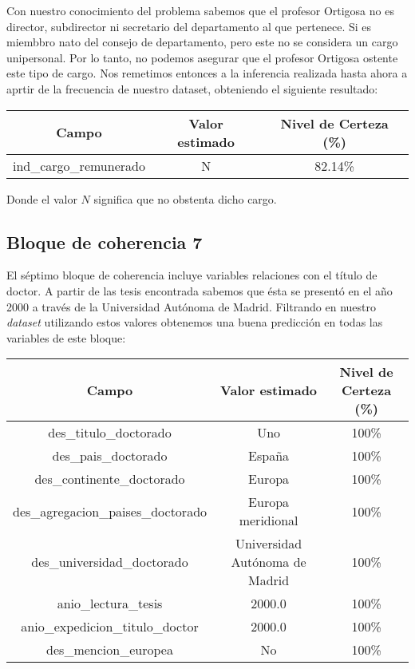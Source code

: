\documentclass[a4paper]{article}
\begin{document}
Con nuestro conocimiento del problema sabemos que el profesor Ortigosa no es director, subdirector ni secretario del departamento al que pertenece. Si es miembbro nato del consejo de departamento, pero este no se considera un cargo unipersonal. Por lo tanto, no podemos asegurar que el profesor Ortigosa ostente este tipo de cargo. Nos remetimos entonces a la inferencia realizada hasta ahora a aprtir de la frecuencia de nuestro dataset, obteniendo el siguiente resultado:

\begin{table}[H]
	\centering
	\begin{tabular}{ccc}
		\textbf{Campo}                         & \textbf{Valor estimado}                               & \textbf{Nivel de Certeza (\%)} \\ \hline
		ind\_cargo\_remunerado                 & N                                  & 82.14\%                     
	\end{tabular}
\end{table}

Donde el valor $N$ significa que no obstenta dicho cargo.

\subsection{Bloque de coherencia 7}

El séptimo bloque de coherencia incluye variables relaciones con el título de doctor. A partir de las tesis encontrada sabemos que ésta se presentó en el año 2000 a través de la Universidad Autónoma de Madrid. Filtrando en nuestro \emph{dataset} utilizando estos valores obtenemos una buena predicción en todas las variables de este bloque:

\begin{table}[H]
	\centering
	\begin{tabular}{ccc}
		\textbf{Campo}                     & \textbf{Valor estimado}        & \textbf{Nivel de Certeza (\%)} \\ \hline
		des\_titulo\_doctorado             & Uno                            & 100\%                          \\
		des\_pais\_doctorado               & España                         & 100\%                          \\
		des\_continente\_doctorado         & Europa                         & 100\%                          \\
		des\_agregacion\_paises\_doctorado & Europa meridional              & 100\%                          \\
		des\_universidad\_doctorado        & Universidad Autónoma de Madrid & 100\%                          \\
		anio\_lectura\_tesis               & 2000.0                         & 100\%                          \\
		anio\_expedicion\_titulo\_doctor   & 2000.0                         & 100\%                        \\
		des\_mencion\_europea              & No                             & 100\%                         
	\end{tabular}
\end{table}
\end{document}
